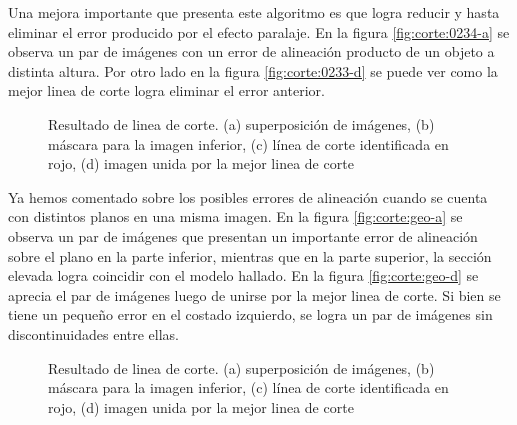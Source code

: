 Una mejora importante que presenta este algoritmo es que logra reducir y hasta eliminar el error producido por el efecto paralaje. En la figura \ref{fig:corte:0234-a} se observa un par de imágenes con un error de alineación producto de un objeto a distinta altura. Por otro lado en la figura \ref{fig:corte:0233-d} se puede ver como la mejor linea de corte logra eliminar el error anterior.

\begin{figure}[H]
	\centering     %
	\hspace{0.05\textwidth}%
	
	
	\caption[Resultado de linea de corte: \textit{Chuspa}]{Resultado de linea de corte. (a) superposición de imágenes, (b) máscara para la imagen inferior, (c) línea de corte identificada en rojo, (d) imagen unida por la mejor linea de corte}
	\label{imagen:cut:0234}
\end{figure}

Ya hemos comentado sobre los posibles errores de alineación cuando se cuenta con distintos planos en una misma imagen. En la figura \ref{fig:corte:geo-a} se observa un par de imágenes que presentan un importante error de alineación sobre el plano en la parte inferior, mientras que en la parte superior, la sección elevada logra coincidir con el modelo hallado. En la figura \ref{fig:corte:geo-d} se aprecia el par de imágenes luego de unirse por la mejor linea de corte. Si bien se tiene un pequeño error en el costado izquierdo, se logra un par de imágenes sin discontinuidades entre ellas.

\begin{figure}[H]
	\centering     %
	\hspace{0.1\textwidth}%
	
	
	\caption[Resultado de linea de corte: \textit{Grava}]{Resultado de linea de corte. (a) superposición de imágenes, (b) máscara para la imagen inferior, (c) línea de corte identificada en rojo, (d) imagen unida por la mejor linea de corte}
	\label{imagen:cut:geo}
\end{figure}

